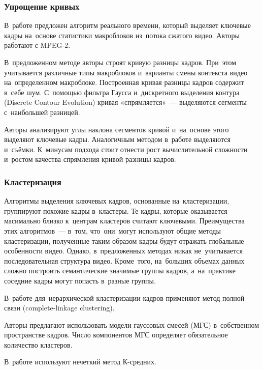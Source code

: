 \subsubsection{Упрощение кривых}

В~работе \cite{Calic:2002} предложен алгоритм реального времени,
который выделяет ключевые кадры на~основе статистики макроблоков
из~потока сжатого видео. Авторы работают с  MPEG-2.

В~предложенном методе авторы строят кривую разницы кадров.
При~этом учитывается различные типы макроблоков
и~варианты смены контекста видео на~определенном макроблоке.
Построенная кривая разницы кадров содержит в~себе шум.
С~помощью фильтра Гаусса
и~дискретного выделения контура (Discrete Contour Evolution)
кривая «спрямляется»~— выделяются сегменты с~наибольшей разницей.

Авторы анализируют углы наклона сегментов кривой
и~на~основе этого выделяют ключевые кадры.
Аналогичным методом в~работе выделяются и~съёмки.
К~минусам подхода стоит отнести рост вычислительной сложности
и~ростом качества спрямления кривой разницы кадров.


\subsubsection{Кластеризация}

Алгоритмы выделения ключевых кадров, основанные на~кластеризации,
группируют похожие кадры в~кластеры.
Те кадры, которые оказывается масимально близко к~центрам кластеров
считают ключевыми.
Преимущества этих алгоритмов~— в~том, что~они~могут используют общие методы
кластеризации, полученные таким образом кадры будут
отражать глобальные особенности видео.
Однако, в~предложенных методах никак не~учитывается последовательная
структура видео. Кроме~того, на~больших объемах данных сложно построить
семантические значимые группы кадров,
а~на~практике соседние кадры могут попасть в~разные группы.

В~работе \cite{Girgensohn:2000} для~иерархической
кластеризации кадров
применяют метод полной связи
(complete-linkage clustering).

Авторы \cite{Liu:2003} предлагают использовать модели гауссовых смесей (МГС)
в~собственном пространстве кадров. Число компонентов
МГС определяет обязательное количество кластеров.

В~работе \cite{Wang:2007} используют нечеткий метод К-средних.


